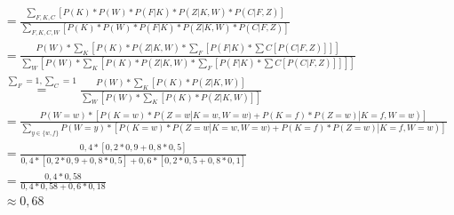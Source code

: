\documentclass[a4paper,10pt]{article}
\begin{document}
\begin{enumerate}[~~a.)]
\begin{align*}
        	&= \frac{\sum_{F,K,C} [P(K) * P(W) * P(F |K) *P(Z|K,W)*P(C|F,Z)]}{\sum_{F,K,C,W} [P(K) * P(W) * P(F |K) *P(Z|K,W)*P(C|F,Z)]}\\
        	&= \frac{P(W) *\sum_{K} [P(K) *P(Z|K,W) * \sum_{F}[P(F |K) * \sum{C}[P(C|F,Z)]]]}{\sum_{W}[P(W) *\sum_{K} [P(K) *P(Z|K,W) * \sum_{F}[P(F |K) * \sum{C}[P(C|F,Z)]]]]}\\
        	&\stackrel{\sum_{F}=1,\sum_{C}=1}= \frac{P(W) *\sum_{K} [P(K) *P(Z|K,W)]}{\sum_{W}[P(W) *\sum_{K} [P(K) *P(Z|K,W)]]}\\
        	&= \frac{P(W = w) * [P(K =w)* P(Z = w|K=w,W=w)+P(K=f)*P(Z=w)|K=f,W=w)]}{\sum_{y \in \{w, f\}}P(W = y) * [P(K =w)* P(Z = w|K=w,W=w)+P(K=f)*P(Z=w)|K=f,W=w)]} \\
        	&= \frac{0,4* [0,2*0,9+0,8*0,5]}{0,4* [0,2*0,9+0,8*0,5] + 0,6 * [0,2*0,5+0,8*0,1]} \\
        	&= \frac{0,4*0,58}{0,4*0,58+0,6*0,18} \\
        	&\approx 0,68
        \end{align*}
    \end{enumerate}
\end{document}
